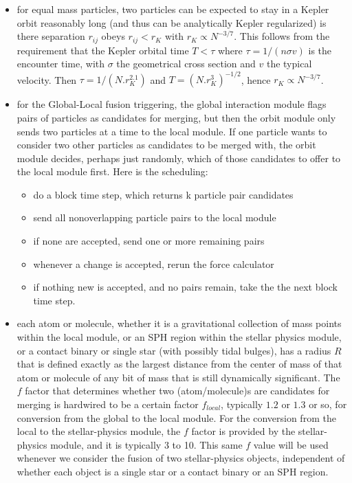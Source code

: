 \documentclass{article}[12pt]
\begin{document}
\begin{itemize}

\item for equal mass particles, two particles can be expected to
   stay in a Kepler orbit reasonably long (and thus can be
   analytically Kepler regularized) is there separation
   $r_{ij}$ obeys $r_{ij} < r_K$ with $r_K \propto N^{-3/7}$.
   This follows from the requirement that the Kepler orbital
   time $T < \tau$ where $\tau = 1/(n \sigma v)$ is the
   encounter time, with $\sigma$ the geometrical cross section
   and $v$ the typical velocity.  Then $\tau = 1/(N.r_K^2.1)$
   and $T=(N.r_K^3)^{-1/2}$, hence $r_K \propto N^{-3/7}$.

\item for the Global-Local fusion triggering, the global interaction
   module flags pairs of particles as candidates for merging, but
   then the orbit module only sends two particles at a time to
   the local module.  If one particle wants to consider two other
   particles as candidates to be merged with, the orbit module
   decides, perhaps just randomly, which of those candidates to
   offer to the local module first.  Here is the scheduling:
\begin{itemize}
   \item do a block time step, which returns k particle pair candidates
   \item send all nonoverlapping particle pairs to the local module
   \item if none are accepted, send one or more remaining pairs
   \item whenever a change is accepted, rerun the force calculator
   \item if nothing new is accepted, and no pairs remain, take the
      the next block time step.
\end{itemize}

\item each atom or molecule, whether it is a gravitational collection
   of mass points within the local module, or an SPH region within
   the stellar physics module, or a contact binary or single
   star (with possibly tidal bulges), has a radius $R$ that is
   defined exactly as the largest distance from the center of
   mass of that atom or molecule of any bit of mass that is still
   dynamically significant. The $f$ factor that determines whether
   two (atom/molecule)s are candidates for merging is hardwired
   to be a certain factor $f_{local}$, typically $1.2$ or $1.3$
   or so, for conversion from the global to the local module.
   For the conversion from the local to the stellar-physics module,
   the $f$ factor is provided by the stellar-physics module, and
   it is typically 3 to 10.  This same $f$ value will be used
   whenever we consider the fusion of two stellar-physics objects,
   independent of whether each object is a single star or a
   contact binary or an SPH region.


\end{itemize}
\end{document}
